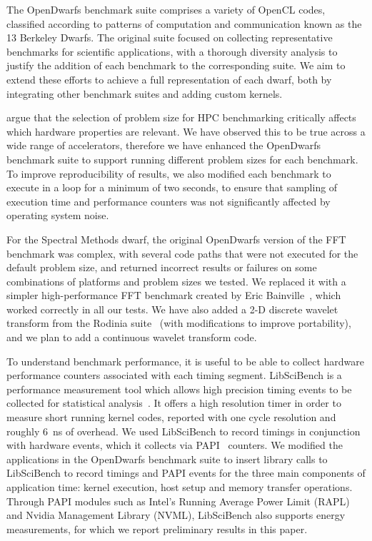 \documentclass[../document.tex]{subfiles}
\begin{document}
\label{sec:extending_the_opendwarfs_benchmark_suite}

The OpenDwarfs benchmark suite comprises a variety of OpenCL codes, classified according to patterns of computation and communication known as the 13 Berkeley Dwarfs.\cite{asanovic2006landscape}
The original suite focused on collecting representative benchmarks for scientific applications, with a thorough diversity analysis to justify the addition of each benchmark to the corresponding suite.
We aim to extend these efforts to achieve a full representation of each dwarf, both by integrating other benchmark suites and adding custom kernels.

\citet{marjanovic2016hpc} argue that the selection of problem size for HPC benchmarking critically affects which hardware properties are relevant.
We have observed this to be true across a wide range of accelerators, therefore we have enhanced the OpenDwarfs benchmark suite to support running different problem sizes for each benchmark.
To improve reproducibility of results, we also modified each benchmark to execute in a loop for a minimum of two seconds, to ensure that sampling of execution time and performance counters was not significantly affected by operating system noise.

For the Spectral Methods dwarf, the original OpenDwarfs version of the FFT benchmark was complex, with several code paths that were not executed for the default problem size, and returned incorrect results or failures on some combinations of platforms and problem sizes we tested.
We replaced it with a simpler high-performance FFT benchmark created by Eric Bainville~\cite{bainville2010fft}, which worked correctly in all our tests.
We have also added a 2-D discrete wavelet transform from the Rodinia suite~\cite{che2009rodinia} (with modifications to improve portability), and we plan to add a continuous wavelet transform code.

To understand benchmark performance, it is useful to be able to collect hardware performance counters associated with each timing segment.
LibSciBench is a performance measurement tool which allows high precision timing events to be collected for statistical analysis~\cite{hoefler2015scientific}.
It offers a high resolution timer in order to measure short running kernel codes, reported with one cycle resolution and roughly \SI{6}{\nano\second} of overhead.
We used LibSciBench to record timings in conjunction with hardware events, which it collects via PAPI~\cite{mucci1999papi} counters.
We modified the applications in the OpenDwarfs benchmark suite to insert library calls to LibSciBench to record timings and PAPI events for the three main components of application time: kernel execution, host setup and memory transfer operations.
Through PAPI modules such as Intel's Running Average Power Limit (RAPL) and Nvidia Management Library (NVML), LibSciBench also supports energy measurements, for which we report preliminary results in this paper.
\end{document}
